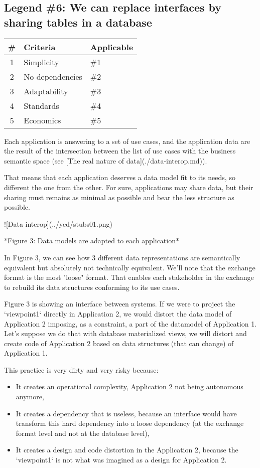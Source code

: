\documentclass[]{article}
\newcommand{\criterias}[5]
{\begin{tabular}{|c|l|l|}
\textbf{\#} & \textbf{Criteria} & \textbf{Applicable} \\
\hline
1 & Simplicity      & \#1 \\
2 & No dependencies & \#2 \\
3 & Adaptability    & \#3 \\
4 & Standards       & \#4 \\
5 & Economics       & \#5 \\
\end{tabular}}
\begin{document}
\subsection{Legend \#6: We can replace interfaces by sharing tables in a database}

\criterias{Yes}{Yes}{Yes}{-}{Yes}

Each application is answering to a set of use cases, and the application data are the result of the intersection between the list of use cases with the business semantic space (see [The real nature of data](./data-interop.md)).

That means that each application deserves a data model fit to its needs, so different the one from the other. For sure, applications may share data, but their sharing must remains as minimal as possible and bear the less structure as possible.

![Data interop](../yed/stubs01.png)

*Figure 3: Data models are adapted to each application*

In Figure 3, we can see how 3 different data representations are semantically equivalent but absolutely not technically equivalent. We'll note that the exchange format is the most "loose" format. That enables each stakeholder in the exchange to rebuild its data structures conforming to its use cases.

Figure 3 is showing an interface between systems. If we were to project the `viewpoint1` directly in Application 2, we would distort the data model of Application 2 imposing, as a constraint, a part of the datamodel of Application 1. Let's suppose we do that with database materialized views, we will distort and create code of Application 2 based on data structures (that can change) of Application 1.

This practice is very dirty and very risky because:

\begin{itemize}
\item It creates an operational complexity, Application 2 not being autonomous anymore,
\item It creates a dependency that is useless, because an interface would have transform this hard dependency into a loose dependency (at the exchange format level and not at the database level),
\item It creates a design and code distortion in the Application 2, because the `viewpoint1` is not what was imagined as a design for Application 2.
\end{itemize}
\end{document}
